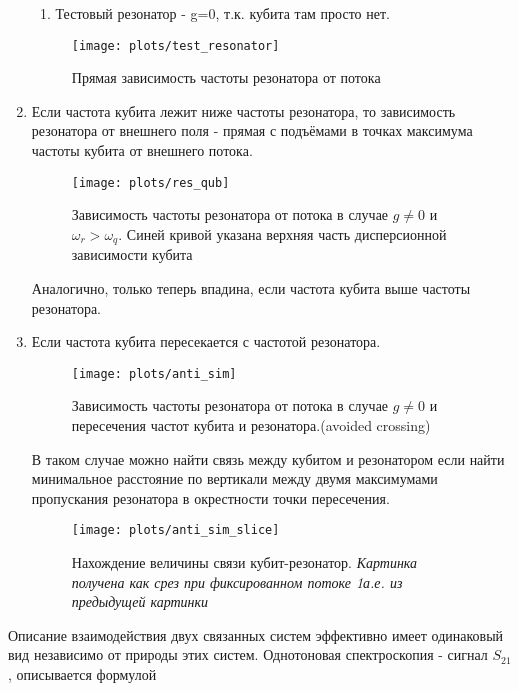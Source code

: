 \documentclass[12pt, a4paper, openany]{book}
\begin{document}
\begin{enumerate}
\begin{enumerate}
	\item Тестовый резонатор - g=0, т.к. кубита там просто нет.
	\end{enumerate} 
	\begin{figure}[H]
		\begin{center}
		\texttt{[image: plots/test\_resonator]}
		\caption{Прямая зависимость частоты резонатора от потока}
		\end{center}
		\label{fig:test_res}
	\end{figure}
\item Если частота кубита лежит ниже частоты резонатора, то зависимость резонатора от внешнего поля - прямая с подъёмами в точках максимума частоты кубита от внешнего потока.
	\begin{figure}[H]
		\begin{center}
		\texttt{[image: plots/res\_qub]}
		\caption{Зависимость частоты резонатора от потока в случае $g\neq0$ и $\omega_r>\omega_q$. Синей кривой указана верхняя часть дисперсионной зависимости кубита}
		\end{center}
	\end{figure}
Аналогично, только теперь впадина, если частота кубита выше частоты резонатора.
\item  Если частота кубита пересекается с частотой резонатора.
	\begin{figure}[H]
		\begin{center}
		\texttt{[image: plots/anti\_sim]}
		\caption{Зависимость частоты резонатора от потока в случае $g\neq0$ и пересечения частот кубита и резонатора.(avoided crossing)}
		\end{center}
	\end{figure}
	В таком случае можно найти связь между кубитом и резонатором если найти минимальное расстояние по вертикали между двумя максимумами пропускания резонатора в окрестности точки пересечения.
	\begin{figure}[H]
		\begin{center}
		\texttt{[image: plots/anti\_sim\_slice]}
		\caption{Нахождение величины связи кубит-резонатор.\textit{ Картинка получена как срез при фиксированном потоке 1а.е. из предыдущей картинки}}
		\end{center}
	\end{figure}
\end{enumerate}
Описание взаимодействия двух связанных систем эффективно имеет одинаковый вид независимо от природы этих систем\cite{Novotny2010}. Однотоновая спектроскопия - сигнал $S_{21}$, описывается формулой 
\end{document}
